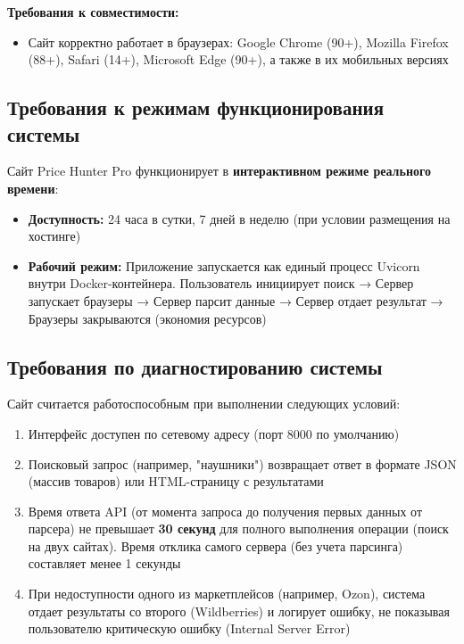 \documentclass[a4paper,12pt]{article}
\begin{document}
\textbf{Требования к совместимости:}
\begin{itemize}
	\item Сайт корректно работает в браузерах: Google Chrome (90+), Mozilla Firefox (88+), Safari (14+), Microsoft Edge (90+), а также в их мобильных версиях
\end{itemize}

\subsection{Требования к режимам функционирования системы}

Сайт Price Hunter Pro функционирует в \textbf{интерактивном режиме реального времени}:
\begin{itemize}
	\item \textbf{Доступность:} 24 часа в сутки, 7 дней в неделю (при условии размещения на хостинге)
	\item \textbf{Рабочий режим:} Приложение запускается как единый процесс Uvicorn внутри Docker-контейнера. Пользователь инициирует поиск → Сервер запускает браузеры → Сервер парсит данные → Сервер отдает результат → Браузеры закрываются (экономия ресурсов)
\end{itemize}

\subsection{Требования по диагностированию системы}

Сайт считается работоспособным при выполнении следующих условий:
\begin{enumerate}
	\item Интерфейс доступен по сетевому адресу (порт 8000 по умолчанию)
	\item Поисковый запрос (например, "наушники") возвращает ответ в формате JSON (массив товаров) или HTML-страницу с результатами
	\item Время ответа API (от момента запроса до получения первых данных от парсера) не превышает \textbf{30 секунд} для полного выполнения операции (поиск на двух сайтах). Время отклика самого сервера (без учета парсинга) составляет менее 1 секунды
	\item При недоступности одного из маркетплейсов (например, Ozon), система отдает результаты со второго (Wildberries) и логирует ошибку, не показывая пользователю критическую ошибку (Internal Server Error)
\end{enumerate}
\end{document}
